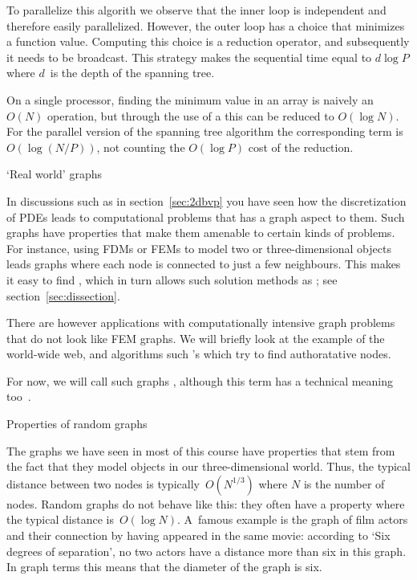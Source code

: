 To parallelize this algorith we observe that the inner loop is
independent and therefore easily parallelized. However, the outer loop
has a choice that minimizes a function value. Computing this
choice is a reduction operator, and subsequently it needs to be broadcast.
This strategy makes the sequential time equal to $d\log P$ where $d$~is
the depth of the spanning tree.

On a single processor, finding the minimum value in an array is
naively an $O(N)$ operation, but through the use of a 
this can be reduced to $O(\log N)$. For the parallel version of the spanning tree
algorithm the corresponding term is~$O(\log (N/P))$, not counting the $O(\log P)$
cost of the reduction.

 {`Real world' graphs}

In discussions such as in section~\ref{sec:2dbvp} you have seen how
the discretization of \acp{PDE} leads to computational problems that
has a graph aspect to them. Such graphs have properties that make them
amenable to certain kinds of problems.
%
For instance, using \acp{FDM} or \acp{FEM} to model two or
three-dimensional objects leads graphs where each node is connected to
just a few neighbours. This makes it easy to find
, which in turn allows such solution methods as
; see section~\ref{sec:dissection}.

There are however applications with computationally intensive graph
problems that do not look like \ac{FEM} graphs. We will briefly look
at the example of the world-wide web, and algorithms such
's  which try to find
authoratative nodes.

For now, we will call such graphs ,
although this term has a technical meaning
too~\cite{Erdos:randomgraph}.

 {Properties of random graphs}

The graphs we have seen in most of this course have properties that
stem from the fact that they model objects in our three-dimensional
world. Thus, the typical distance between two nodes is
typically~$O(N^{1/3})$ where $N$ is the number of nodes. Random graphs
do not behave like this: they often have a 
property where the typical distance is~$O(\log N)$. A~famous example
is the graph of film actors and their connection by having appeared in
the same movie: according to `Six degrees of separation', no two actors
have a distance more than six in this graph. In graph terms this means
that the diameter of the graph is six.

